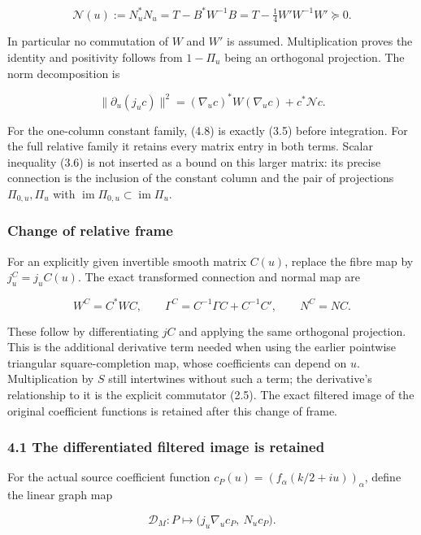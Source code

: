 \[\boxed{\mathcal N(u):=N_u^*N_u=T-B^*W^{-1}B=T-\tfrac14W'W^{-1}W'\succeq0.}\tag{4.7}\]

In particular no commutation of \(W\) and \(W'\) is assumed.
Multiplication proves the identity and positivity follows from
\(1-\Pi_u\) being an orthogonal projection. The norm decomposition is

\[\boxed{\|\partial_u(j_uc)\|^2=(\nabla_uc)^*W(\nabla_uc)+c^*\mathcal N c.}\tag{4.8}\]

For the one-column constant family, (4.8) is exactly (3.5) before
integration. For the full relative family it retains every matrix entry
in both terms. Scalar inequality (3.6) is not inserted as a bound on
this larger matrix: its precise connection is the inclusion of the
constant column and the pair of projections \(\Pi_{0,u},\Pi_u\) with
\(\operatorname{im}\Pi_{0,u}\subset\operatorname{im}\Pi_u\).

\subsubsection{Change of relative frame}\label{sum_connection:change-of-relative-frame}

For an explicitly given invertible smooth matrix \(C(u)\), replace the
fibre map by \(j_u^C=j_uC(u)\). The exact transformed connection and
normal map are

\[W^C=C^*WC,\qquad \Gamma^C=C^{-1}\Gamma C+C^{-1}C',\qquad N^C=NC.\tag{4.12}\]

These follow by differentiating \(jC\) and applying the same orthogonal
projection. This is the additional derivative term needed when using the
earlier pointwise triangular square-completion map, whose coefficients
can depend on \(u\). Multiplication by \(S\) still intertwines without
such a term; the derivative's relationship to it is the explicit
commutator (2.5). The exact filtered image of the original coefficient
functions is retained after this change of frame.

\subsubsection{4.1 The differentiated filtered image is
retained}\label{sum_connection:the-differentiated-filtered-image-is-retained}

For the actual source coefficient function
\(c_P(u)=(f_\alpha(k/2+iu))_\alpha\), define the linear graph map

\[\mathscr D_M:P\longmapsto\bigl(j_u\nabla_uc_P,\ N_uc_P\bigr).\tag{4.9}\]


